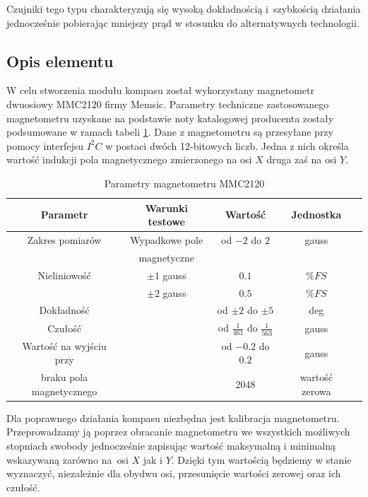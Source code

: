 Czujniki tego typu charakteryzują się wysoką
dokładnością i~szybkością działania jednocześnie pobierając mniejszy prąd w
stosunku do alternatywnych technologii.

\subsection{Opis elementu}
W celu stworzenia modułu kompasu został wykorzystany magnetometr dwuosiowy
MMC2120 firmy Memsic. Parametry techniczne zastosowanego magnetometru uzyskane na podstawie
noty katalogowej producenta \cite{MMC2120DataSheet} zostały podsumowane w ramach 
tabeli \ref{tab:MMC2120Char}. Dane z magnetometru są przesyłane przy pomocy interfejsu $I^{2}C$ w postaci dwóch
12-bitowych liczb. Jedna z nich określa wartość indukcji pola magnetycznego
zmierzonego na osi $X$ druga zaś na osi $Y$. \hfill

\begin{table}[!ht]
\centering
\caption{Parametry magnetometru MMC2120}
   	\begin{tabular}{ | c | c | c | c | p{1.75cm} |} \hline
   		Parametr & Warunki testowe & Wartość & Jednostka \\ \hline
   		Zakres pomiarów & Wypadkowe pole & od $-2$ do $2$ & gauss\\	& magnetyczne & & \\ \hline
   		Nieliniowość & $\pm 1$ gauss & $0.1$ & $\% FS$ \\ & $\pm 2$ gauss & $0.5$ & $\% FS$ \\ \hline
   		Dokładność & & od $\pm 2$ do $\pm 5$ & deg \\ \hline
   		Czułość & & od $\frac{1}{461}$ do $\frac{1}{563}$ & gauss \\ \hline
   		Wartość na wyjściu przy & & od $-0.2$ do $0.2$ & gauss \\
   		braku pola magnetycznego & & 2048 & wartość zerowa \\ \hline
   	\end{tabular}
\label{tab:MMC2120Char}
\end{table}

Dla poprawnego działania kompasu niezbędna jest kalibracja magnetometru.
Przeprowadzamy ją poprzez obracanie magnetometru we wszystkich możliwych
stopniach swobody jednocześnie zapisując wartość maksymalną i minimalną
wskazywaną zarówno na~osi $X$ jak i $Y$. Dzięki tym wartością będziemy w stanie
wyznaczyć, niezależnie dla obydwu osi, przesunięcie wartości zerowej oraz ich
czułość. 

